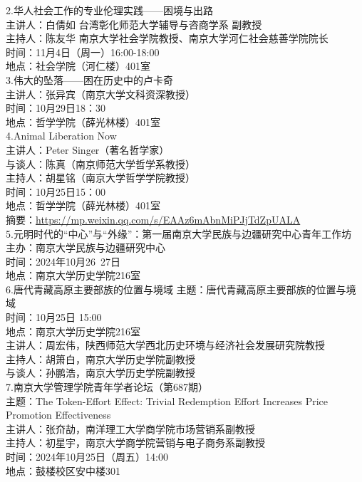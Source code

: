 \documentclass[letterpaper, 12pt]{article}
\begin{document}
\begin{multicols}{2}
2.华人社会工作的专业伦理实践——困境与出路\\
主讲人：白倩如 台湾彰化师范大学辅导与咨商学系 副教授\\
主持人：陈友华 南京大学社会学院教授、南京大学河仁社会慈善学院院长\\
时间：11月4日（周一）16:00-18:00\\
地点：社会学院（河仁楼）401室\\

3.伟大的坠落——困在历史中的卢卡奇\\
主讲人：张异宾（南京大学文科资深教授）\\
时间：10月29日18：30\\
地点：哲学学院（薛光林楼）401室\\

4.Animal Liberation Now\\
主讲人：Peter Singer（著名哲学家）\\
与谈人：陈真（南京师范大学哲学系教授）\\
主持人：胡星铭（南京大学哲学学院教授）\\
时间：10月25日15：00\\
地点：哲学学院（薛光林楼）401室\\
摘要：\url{https://mp.weixin.qq.com/s/EAAz6mAbnMiPJjTdZpUALA}\\

5.元明时代的“中心”与“外缘”：第一届南京大学民族与边疆研究中心青年工作坊\\
主办：南京大学民族与边疆研究中心\\
时间：2024年10月26~27日\\
地点：南京大学历史学院216室\\

6.唐代青藏高原主要部族的位置与境域
主题：唐代青藏高原主要部族的位置与境域\\
时间：10月25日 15:00\\
地点：南京大学历史学院216室\\
主讲人：周宏伟，陕西师范大学西北历史环境与经济社会发展研究院教授\\
主持人：胡箫白，南京大学历史学院副教授\\
与谈人：孙鹏浩，南京大学历史学院副教授\\

7.南京大学管理学院青年学者论坛（第687期）\\
主题：The Token-Effort Effect: Trivial Redemption Effort Increases Price Promotion Effectiveness\\
主讲人：张夼劼，南洋理工大学商学院市场营销系副教授\\
主持人：初星宇，南京大学商学院营销与电子商务系副教授\\
时间：2024年10月25日（周五）14:00\\
地点：鼓楼校区安中楼301\\


\end{multicols}
\end{document}
